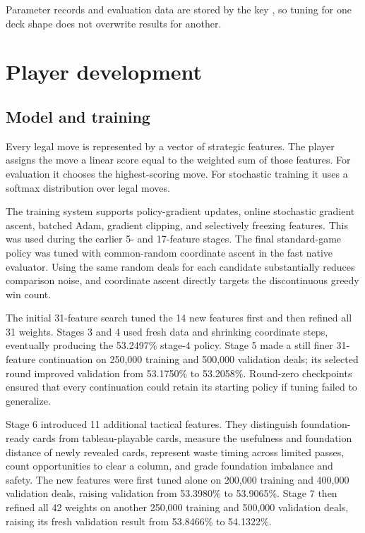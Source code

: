 \documentclass[11pt]{article}
\begin{document}
Parameter records and evaluation data are stored by the key \texttt{}, so tuning for one deck shape does not overwrite results for another.

\section{Player development}

\subsection{Model and training}

Every legal move is represented by a vector of strategic features. The player assigns the move a linear score equal to the weighted sum of those features. For evaluation it chooses the highest-scoring move. For stochastic training it uses a softmax distribution over legal moves.

The training system supports policy-gradient updates, online stochastic gradient ascent, batched Adam, gradient clipping, and selectively freezing features. This was used during the earlier 5- and 17-feature stages. The final standard-game policy was tuned with common-random coordinate ascent in the fast native evaluator. Using the same random deals for each candidate substantially reduces comparison noise, and coordinate ascent directly targets the discontinuous greedy win count.

The initial 31-feature search tuned the 14 new features first and then refined all 31 weights. Stages 3 and 4 used fresh data and shrinking coordinate steps, eventually producing the 53.2497\% stage-4 policy. Stage 5 made a still finer 31-feature continuation on 250,000 training and 500,000 validation deals; its selected round improved validation from 53.1750\% to 53.2058\%. Round-zero checkpoints ensured that every continuation could retain its starting policy if tuning failed to generalize.

Stage 6 introduced 11 additional tactical features. They distinguish foundation-ready cards from tableau-playable cards, measure the usefulness and foundation distance of newly revealed cards, represent waste timing across limited passes, count opportunities to clear a column, and grade foundation imbalance and safety. The new features were first tuned alone on 200,000 training and 400,000 validation deals, raising validation from 53.3980\% to 53.9065\%. Stage 7 then refined all 42 weights on another 250,000 training and 500,000 validation deals, raising its fresh validation result from 53.8466\% to 54.1322\%.
\end{document}
